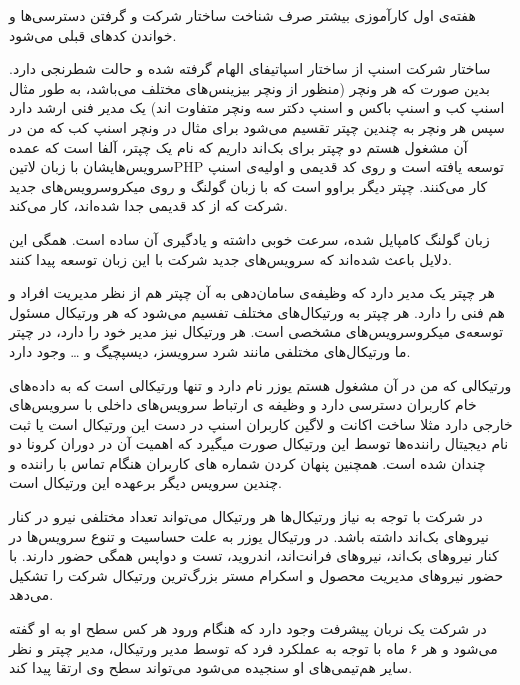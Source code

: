 \documentclass[a4]{report}
\begin{document}


هفته‌ی اول کارآموزی بیشتر صرف شناخت ساختار شرکت و گرفتن دسترسی‌ها و خواندن کدهای قبلی می‌شود.

ساختار شرکت اسنپ از ساختار اسپاتیفای الهام گرفته شده و حالت شطرنجی دارد.
بدین صورت که هر ونچر (منظور از ونچر بیزینس‌های مختلف می‌باشد،
به طور مثال اسنپ کب و اسنپ باکس و اسنپ دکتر سه ونچر متفاوت اند)
یک مدیر فنی ارشد دارد سپس هر ونچر به چندین چپتر تقسیم می‌شود برای مثال در ونچر اسنپ کب که من در آن مشغول هستم
دو چپتر برای بک‌اند داریم که نام یک چپتر، آلفا است که عمده سرویس‌هایشان با زبان ‌لاتین{PHP} توسعه یافته است و روی کد قدیمی و اولیه‌ی اسنپ کار می‌کنند.
چپتر دیگر براوو است که با زبان گولنگ و روی میکروسرویس‌های جدید شرکت که از کد قدیمی جدا شده‌اند، کار می‌کند.

زبان گولنگ کامپایل شده، سرعت خوبی داشته و یادگیری آن ساده است. همگی این دلایل باعث شده‌اند که سرویس‌های جدید شرکت با این زبان توسعه پیدا کنند.

هر چپتر یک مدیر دارد که وظیفه‌ی سامان‌دهی به آن چپتر هم از نظر مدیریت افراد و هم فنی را دارد.
هر چپتر به ورتیکال‌های مختلف تفسیم می‌شود که هر ورتیکال مسئول توسعه‌ی میکروسرویس‌های مشخصی است.
هر ورتیکال نیز مدیر خود را دارد، در چپتر ما ورتیکال‌های مختلفی مانند شرد سرویسز، دیسپچیگ و … وجود دارد.

ورتیکالی که من در آن مشغول هستم یوزر نام دارد و تنها ورتیکالی است که به داده‌های خام کاربران دسترسی دارد و وظیفه ی ارتباط سرویس‌های داخلی
با سرویس‌های خارجی دارد مثلا ساخت اکانت و لاگین کاربران اسنپ در دست این ورتیکال است
یا ثبت نام دیجیتال راننده‌ها توسط این ورتیکال صورت میگیرد که اهمیت آن در دوران کرونا دو چندان شده است.
همچنین پنهان کردن شماره های کاربران هنگام تماس با راننده و چندین سرویس دیگر برعهده این ورتیکال است.

در شرکت با توجه به نیاز ورتیکال‌ها هر ورتیکال می‌تواند تعداد مختلفی نیرو در کنار نیروهای بک‌اند داشته باشد.
در ورتیکال یوزر به علت حساسیت و تنوع سرویس‌ها در کنار نیروهای بک‌اند،
نیروهای فرانت‌اند، اندروید، تست و دواپس همگی حضور دارند.
با حضور نیروهای مدیریت محصول و اسکرام مستر بزرگ‌ترین ورتیکال شرکت را تشکیل می‌دهد.

در شرکت یک نربان پیشرفت وجود دارد که هنگام ورود هر کس سطح او به او گفته می‌شود و هر ۶ ماه با توجه به عملکرد فرد که توسط مدیر ورتیکال، مدیر چپتر
و نظر سایر هم‌تیمی‌های او سنجیده می‌شود می‌تواند سطح وی ارتقا پیدا کند.
\end{document}
